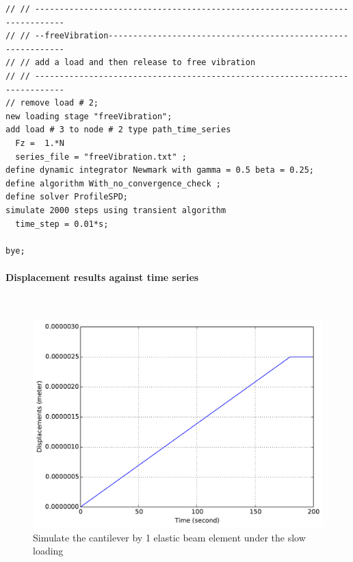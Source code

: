 \begin{lstlisting}
// // ----------------------------------------------------------------------------
// // --freeVibration-------------------------------------------------------------
// // add a load and then release to free vibration
// // ----------------------------------------------------------------------------
// remove load # 2;
new loading stage "freeVibration";
add load # 3 to node # 2 type path_time_series 
  Fz =  1.*N
  series_file = "freeVibration.txt" ;
define dynamic integrator Newmark with gamma = 0.5 beta = 0.25;
define algorithm With_no_convergence_check ;
define solver ProfileSPD;
simulate 2000 steps using transient algorithm 
  time_step = 0.01*s;

bye;
\end{lstlisting}

\paragraph{Displacement results against time series} ~

\begin{figure}[!htb]
  \centering
  \includegraphics[width=12cm]{./Figure-files/_Chapter_Appendix_Illustrative_Examples/beam-1element-slowLoading.pdf}
  \caption{Simulate the cantilever by 1 elastic beam element under the slow loading}
  \label{fig_beam1_slow}
\end{figure}


